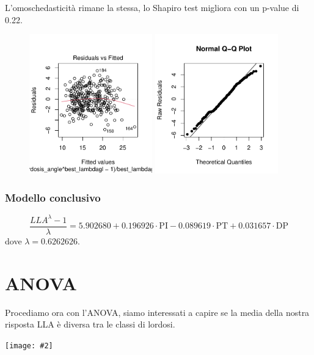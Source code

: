 \documentclass{beamer}
\newcommand{\fg}[2]{%
  \begin{center}
      \texttt{[image: \#2]}%
  \end{center}
}
\begin{document}
\begin{frame}
	L'omoschedasticità rimane la stessa, lo Shapiro test migliora con un p-value di 0.22.
	\begin{figure}
	   \includegraphics[width=0.475\textwidth]{12omoschedasticita}
	   \hfill
	   \includegraphics[width=0.475\textwidth]{13qqplot}
	\end{figure}
\end{frame}

\begin{frame}
	\frametitle{Modello conclusivo}
	$$
	\frac{LLA^{\lambda}-1}{\lambda} = 5.902680 + 0.196926 \cdot \text{PI} -0.089619 \cdot \text{PT} + 0.031657 \cdot \text{DP}
	$$
	dove $\lambda=0.6262626$.
\end{frame}






\section{ANOVA}

\begin{frame}
	Procediamo ora con l'ANOVA, siamo interessati a capire se la media della nostra risposta LLA è diversa tra le classi di lordosi.
	\fg{0.6}{14boxplot}
\end{frame}
\end{document}
